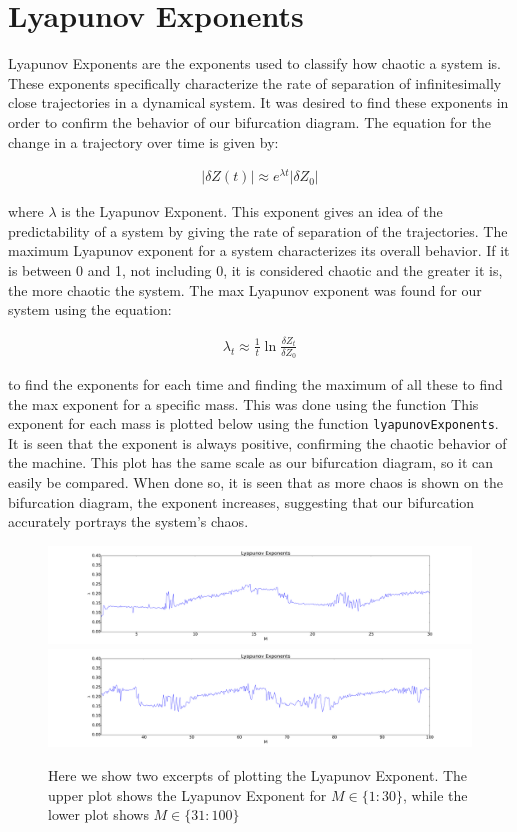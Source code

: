 \documentclass{article}
\begin{document}
\section*{Lyapunov Exponents}

Lyapunov Exponents are the exponents used to classify how chaotic a system is.  These exponents specifically characterize the rate of separation of infinitesimally close trajectories in a dynamical system.  It was desired to find these exponents in order to confirm the behavior of our bifurcation diagram. The equation for the change in a trajectory over time is given by:

\begin{gather*}
|\delta Z(t)| \approx e^{{\lambda t}}|\delta Z_{0}|
\end{gather*}

where  $\lambda$ is the Lyapunov Exponent. This exponent gives an idea of the predictability of a system by giving the rate of separation of the trajectories. The maximum Lyapunov exponent for a system characterizes its overall behavior. If it is between 0 and 1, not including 0, it is considered chaotic and the greater it is, the more chaotic the system. The max Lyapunov exponent was found for our system using the equation:

\begin{gather*}
\lambda_{t} \approx \frac{1}{t}\ln{\frac{\delta Z_{t}}{\delta Z_{0}}}
\end{gather*}

to find the exponents for each time and finding the maximum of all these to find the max exponent for a specific mass.  This was done using the function  This exponent for each mass is plotted below using the function \texttt{lyapunovExponents}.  It is seen that the exponent is always positive, confirming the chaotic behavior of the machine. This plot has the same scale as our bifurcation diagram, so it can easily be compared. When done so, it is seen that as more chaos is shown on the bifurcation diagram, the exponent increases, suggesting that our bifurcation accurately portrays the system's chaos. 

\begin{figure}
\centering
\includegraphics[width=\textwidth]{Lyapunov_2_30}
\includegraphics[width=\textwidth]{Lyapunov_31_100}
\caption{Here we show two excerpts of plotting the Lyapunov Exponent.  The upper plot shows the Lyapunov Exponent for $M \in \{1:30\}$, while the lower plot shows $M \in \{31:100\}$}
\label{lyapunovs}
\end{figure} 
\end{document}
